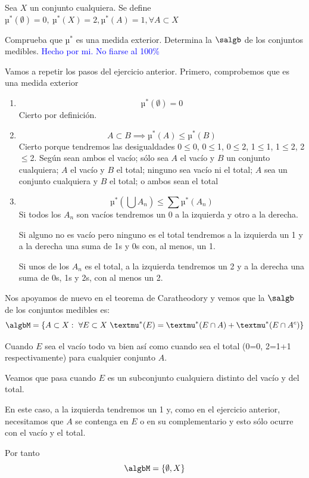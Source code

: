 \begin{problem}[13]
Sea $X$ un conjunto cualquiera. Se define $µ^*(\emptyset)=0, \ µ^*(X)=2, µ^*(A)=1, \forall A \subset X$

Comprueba que $µ^*$ es una medida exterior. Determina la $\salgb$ de los conjuntos medibles.
\solution
\textcolor{blue}{Hecho por mi. No fiarse al 100\%}

Vamos a repetir los pasos del ejercicio anterior. Primero, comprobemos que es una medida exterior
\begin{enumerate}
\item
\[µ^*(\emptyset)=0\]
Cierto por definición.
\item
\[A \subset B \implies µ^*(A)\leq µ^*(B)\]
Cierto porque tendremos las desigualdades 0$\leq$0, 0$\leq$1, 0$\leq$2, 1$\leq$1, 1$\leq$2, 2$\leq$2. Según sean ambos el vacío; sólo sea $A$ el vacío y $B$ un conjunto cualquiera; $A$ el vacío y $B$ el total; ninguno sea vacío ni el total; $A$ sea un conjunto cualquiera y $B$ el total; o ambos sean el total
\item
\[µ^*(\bigcup A_n) \leq \sum µ^*(A_n)\]
Si todos los $A_n$ son vacíos tendremos un 0 a la izquierda y otro a la derecha.

Si alguno no es vacío pero ninguno es el total tendremos a la izquierda un 1 y a la derecha una suma de 1s y 0s con, al menos, un 1.

Si unos de los $A_n$ es el total, a la izquierda tendremos un 2 y a la derecha una suma de 0s, 1s y 2s, con al menos un 2.
\end{enumerate}

Nos apoyamos de nuevo en el teorema de Caratheodory y vemos que la $\salgb$ de los conjuntos medibles es:
\[\algbM = \{A \subset X: \ \forall E \subset X \ µ^*(E)=µ^*(E \cap A) + µ^*(E \cap A^c)\}\]

Cuando $E$ sea el vacío todo va bien así como cuando sea el total (0=0, 2=1+1 respectivamente) para cualquier conjunto $A$.

Veamos que pasa cuando $E$ es un subconjunto cualquiera distinto del vacío y del total.

En este caso, a la izquierda tendremos un 1 y, como en el ejercicio anterior, necesitamos que $A$ se contenga en $E$ o en su complementario y esto sólo ocurre con el vacío y el total.

Por tanto
\[\algbM = \{\emptyset, X\}\]
\end{problem}

